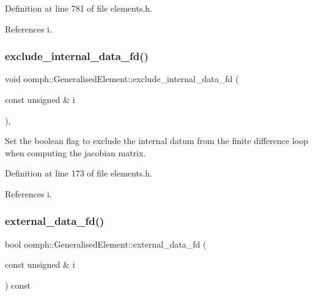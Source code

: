 Definition at line 781 of file elements.\+h.



References i.

\mbox{\label{classoomph_1_1GeneralisedElement_a3609beaea7104b223d6f7750f071f023}} 
\subsubsection{\texorpdfstring{exclude\+\_\+internal\+\_\+data\+\_\+fd()}{exclude\_internal\_data\_fd()}}
{\footnotesize\ttfamily void oomph\+::\+Generalised\+Element\+::exclude\+\_\+internal\+\_\+data\+\_\+fd (\begin{DoxyParamCaption}\item[{const unsigned \&}]{i }\end{DoxyParamCaption})\hspace{0.3cm}{\ttfamily [inline]}, {\ttfamily [protected]}}



Set the boolean flag to exclude the internal datum from the finite difference loop when computing the jacobian matrix. 



Definition at line 173 of file elements.\+h.



References i.

\mbox{\label{classoomph_1_1GeneralisedElement_a34e8a59703e2b223406112525104034c}} 
\subsubsection{\texorpdfstring{external\+\_\+data\+\_\+fd()}{external\_data\_fd()}}
{\footnotesize\ttfamily bool oomph\+::\+Generalised\+Element\+::external\+\_\+data\+\_\+fd (\begin{DoxyParamCaption}\item[{const unsigned \&}]{i }\end{DoxyParamCaption}) const\hspace{0.3cm}{\ttfamily [inline]}}



